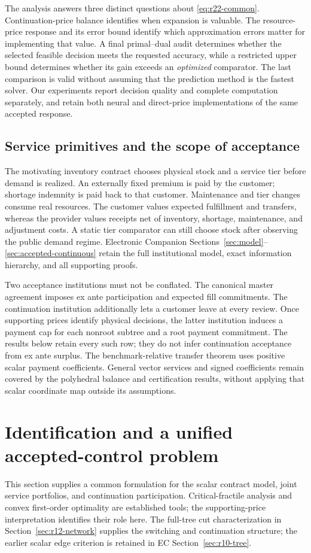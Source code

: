 \documentclass[11pt,letterpaper]{article}
\theoremstyle{definition}
\newcommand{\1}{\mathbf 1}
\begin{document}
The analysis answers three distinct questions about \eqref{eq:r22-common}. Continuation-price balance identifies when expansion is valuable. The resource-price response and its error bound identify which approximation errors matter for implementing that value. A final primal--dual audit determines whether the selected feasible decision meets the requested accuracy, while a restricted upper bound determines whether its gain exceeds an \emph{optimized} comparator. The last comparison is valid without assuming that the prediction method is the fastest solver. Our experiments report decision quality and complete computation separately, and retain both neural and direct-price implementations of the same accepted response.

\subsection{Service primitives and the scope of acceptance}
The motivating inventory contract chooses physical stock and a service tier
before demand is realized. An externally fixed premium is paid by the customer;
shortage indemnity is paid back to that customer. Maintenance and tier changes
consume real resources. The customer values expected fulfillment and transfers,
whereas the provider values receipts net of inventory, shortage, maintenance,
and adjustment costs. A static tier comparator can still choose stock after
observing the public demand regime. Electronic Companion
Sections~\ref{sec:model}--\ref{sec:accepted-continuous} retain the full institutional
model, exact information hierarchy, and all supporting proofs.

Two acceptance institutions must not be conflated. The canonical master
agreement imposes ex ante participation and expected fill commitments. The
continuation institution additionally lets a customer leave at every review.
Once supporting prices identify physical decisions, the latter institution
induces a payment cap for each nonroot subtree and a root payment commitment.
The results below retain every such row; they do not infer continuation
acceptance from ex ante surplus. The benchmark-relative transfer theorem uses
positive scalar payment coefficients. General vector services and signed
coefficients remain covered by the polyhedral balance and certification
results, without applying that scalar coordinate map outside its assumptions.


\section{Identification and a unified accepted-control problem}\label{sec:r10-general}
This section supplies a common formulation for the scalar contract model, joint service portfolios, and continuation participation. Critical-fractile analysis and convex first-order optimality are established tools; the supporting-price interpretation identifies their role here. The full-tree cut characterization in Section~\ref{sec:r12-network} supplies the switching and continuation structure; the earlier scalar edge criterion is retained in EC Section~\ref{sec:r10-tree}.
\end{document}
